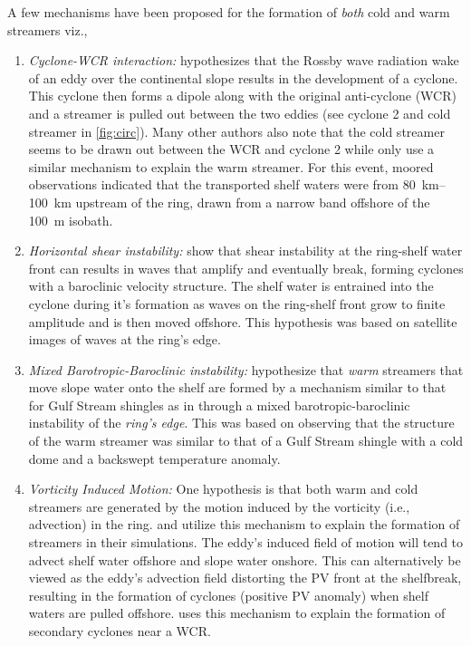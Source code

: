 A few mechanisms have been proposed for the formation of \emph{both} cold and warm streamers viz.,
\begin{enumerate}
\item \emph{Cyclone-WCR interaction:} \cite{Ramp1986} hypothesizes that the Rossby wave radiation wake of an eddy over the continental slope results in the development of a cyclone. This cyclone then forms a dipole along with the original anti-cyclone (WCR) and a streamer is pulled out between the two eddies (see cyclone 2 and cold streamer in \cref{fig:circ}).  Many other authors also note that the cold streamer seems to be drawn out between the WCR and cyclone 2 \citep[e.g.\ ][]{Evans1985,Zhang2009} while only \cite{Evans1985} use a similar mechanism to explain the warm streamer. For this event, moored observations indicated that the transported shelf waters were from \SIrange{80}{100}{\km} upstream of the ring, drawn from a narrow band offshore of the \SI{100}{\m} isobath.


\item \emph{Horizontal shear instability:} \citep{Ramp1983} show that shear instability at the ring-shelf water front can results in waves that amplify and eventually break, forming cyclones with a baroclinic velocity structure. The shelf water is entrained into the cyclone during it’s formation as waves on the ring-shelf front grow to finite amplitude and is then moved offshore. This hypothesis was based on satellite images of waves at the ring’s edge.

\item \emph{Mixed Barotropic-Baroclinic instability:} \cite{Lee2010} hypothesize that \emph{warm} streamers that move slope water onto the shelf are formed by a mechanism similar to that for Gulf Stream shingles as in \cite{Bane1981} through a mixed barotropic-baroclinic instability of the \emph{ring’s edge}. This was based on observing that the structure of the warm streamer was similar to that of a Gulf Stream shingle with a cold dome and a backswept temperature anomaly.

\item \emph{Vorticity Induced Motion:} One hypothesis is that both warm and cold streamers are generated by the motion induced by the vorticity (i.e., advection) in the ring. \cite{Zhang2009} and \cite{Wang1992} utilize this mechanism to explain the formation of streamers in their simulations. The eddy’s induced field of motion will tend to advect shelf water offshore and slope water onshore. This can alternatively be viewed as the eddy’s advection field distorting the PV front at the shelfbreak, resulting in the formation of cyclones (positive PV anomaly) when shelf waters are pulled offshore.  \cite{Frolov2004} uses this mechanism to explain the formation of secondary cyclones near a WCR.
\end{enumerate}  


